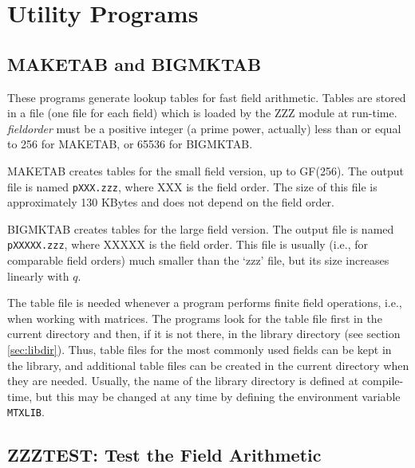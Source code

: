 \section{Utility Programs}

\subsection{MAKETAB and BIGMKTAB} \label{sec:maketab}
\Syntax
{}

\Description
These programs generate lookup tables for fast field arithmetic.
Tables are stored in a file (one file for each field) which is
loaded by the ZZZ module at run-time. {\it fieldorder} must be a
positive integer (a prime power, actually) less than or equal to
256 for MAKETAB, or 65536 for BIGMKTAB.

MAKETAB creates tables for the small field version, up to GF(256).
The output file is named {\tt pXXX.zzz}, where XXX is the field order.
The size of this file is approximately 130 KBytes and does not depend on
the field order.

BIGMKTAB creates tables for the large field version. The output file is
named {\tt pXXXXX.zzz}, where XXXXX is the field order. This file is
usually (i.e., for comparable field orders) much smaller than the
`zzz' file, but its size increases linearly with $q$.

The table file is needed whenever a program performs finite field
operations, i.e., when working with matrices. The programs look for
the table file first in the current directory and then, if it is not
there, in the library directory (see section \ref{sec:libdir}). Thus,
table files for the most commonly used fields can be kept in the
library, and additional table files can be created in the current
directory when they are needed.
Usually, the name of the library directory is defined at compile-time,
but this may be changed at any time by defining the environment
variable {\tt MTXLIB}. 

\subsection{ZZZTEST: Test the Field Arithmetic}
\Syntax
{}

